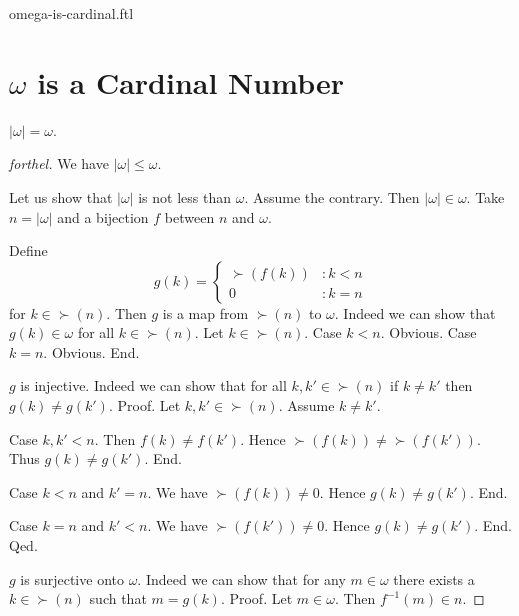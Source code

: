 \documentclass{naproche-library}
\begin{document}
\begin{smodule}{omega-is-cardinal.ftl}

  \section*{$\omega$ is a Cardinal Number}

  \begin{proposition}[forthel,id=SET_THEORY_07_4952029518626816]
    $|\omega| = \omega$.
  \end{proposition}
  \begin{proof}[forthel]
    We have $|\omega| \leq \omega$.

    Let us show that $|\omega|$ is not less than $\omega$.
      Assume the contrary.
      Then $|\omega| \in \omega$.
      Take $n = |\omega|$ and a bijection $f$ between $n$ and $\omega$.

      Define \[ g(k) =
        \begin{cases}
          \succ(f(k)) & : k < n
          \\
          0           & : k = n
        \end{cases} \]
      for $k \in \succ(n)$.
      Then $g$ is a map from $\succ(n)$ to $\omega$.
      Indeed we can show that $g(k) \in \omega$ for all $k \in \succ(n)$.
        Let $k \in \succ(n)$.
        Case $k < n$. Obvious.
        Case $k = n$. Obvious.
      End.

      $g$ is injective.
      Indeed we can show that for all $k, k' \in \succ(n)$ if $k \neq k'$
      then $g(k) \neq g(k')$. \newline
      Proof.
        Let $k, k' \in \succ(n)$.
        Assume $k \neq k'$.

        Case $k, k' < n$.
          Then $f(k) \neq f(k')$.
          Hence $\succ(f(k)) \neq \succ(f(k'))$.
          Thus $g(k) \neq g(k')$.
        End.

        Case $k < n$ and $k' = n$.
          We have $\succ(f(k)) \neq 0$.
          Hence $g(k) \neq g(k')$.
        End.

        Case $k = n$ and $k' < n$.
          We have $\succ(f(k')) \neq 0$.
          Hence $g(k) \neq g(k')$.
        End.
      Qed.

      $g$ is surjective onto $\omega$.
      Indeed we can show that for any $m \in \omega$ there exists a $k \in \succ(n)$ such that $m = g(k)$. \newline
      Proof.
        Let $m \in \omega$.
        Then $f^{-1}(m) \in n$.


\end{proof}
\end{smodule}
\end{document}

